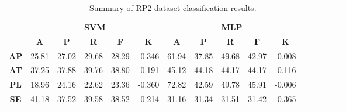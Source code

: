 \begin{landscape}
\begin{table}[htbp]
\footnotesize
\centering
\caption{Summary of RP2 dataset classification results.}
\label{tab:base_female}
\begin{tabular}{|c|c|c|c|c|c|c|c|c|c|c|c|c|c|c|c|}
\hline
\multirow{2}{*}{}	& \multicolumn{5}{c|}{\textbf{SVM}}												& \multicolumn{5}{c|}{\textbf{MLP}}												\\ \cline{2-11} 
					& \textbf{A}	& \textbf{P}	& \textbf{R}	& \textbf{F}	& \textbf{K}	& \textbf{A}	& \textbf{P}	& \textbf{R}	& \textbf{F}	& \textbf{K}	\\ \hline
\textbf{AP}			& 25.81			& 27.02			& 29.68			& 28.29			& -0.346			& 61.94			& 37.85			& 49.68			& 42.97			& -0.008			\\ \hline
\textbf{AT}			& 37.25			& 37.88			& 39.76			& 38.80			& -0.191			& 45.12			& 44.18			& 44.17			& 44.17			& -0.116			\\ \hline
\textbf{PL}			& 18.96			& 24.16			& 22.62			& 23.36			& -0.360			& 72.82			& 42.59			& 49.78			& 45.91			& -0.006			\\ \hline
\textbf{SE}			& 41.18			& 37.52			& 39.58			& 38.52			& -0.214			& 31.16			& 31.34			& 31.51			& 31.42			& -0.365			\\ \hline
\end{tabular}
\end{table}
\end{landscape}